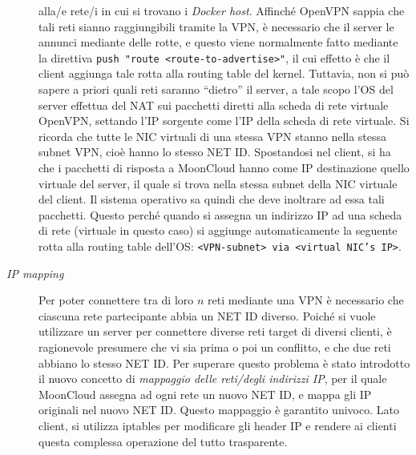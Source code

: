 \begin{description}
	alla/e rete/i in cui si trovano i \textit{Docker host}. Affinché OpenVPN sappia che
	tali reti sianno raggiungibili tramite la VPN, è necessario che il server
	le annunci mediante delle rotte, e questo viene normalmente fatto mediante la direttiva
	\texttt{push "route <route-to-advertise>"}, il cui effetto è che il client aggiunga
	tale rotta alla routing table del kernel. Tuttavia, non si può sapere a priori
	quali reti saranno ``dietro'' il server, a tale scopo l'OS del server
	effettua del NAT sui pacchetti diretti alla scheda di rete virtuale OpenVPN,
	settando l'IP sorgente come l'IP della scheda di rete virtuale. Si ricorda che
	tutte le NIC virtuali di una stessa VPN stanno nella stessa subnet VPN, cioè hanno
	lo stesso NET ID.
	Spostandosi
	nel client, si ha che i pacchetti di risposta a MoonCloud hanno come IP destinazione
	quello virtuale del server, il quale si trova nella stessa subnet della NIC
	virtuale del client. Il sistema operativo sa quindi che deve inoltrare ad essa
	tali pacchetti. 
	Questo perché quando si assegna un indirizzo IP ad una scheda di rete (virtuale in
	questo caso) si
	aggiunge automaticamente la seguente rotta alla routing table dell'OS:
	\texttt{<VPN-subnet> via <virtual NIC's IP>}.
	\item[\textit{IP mapping}]Per poter connettere tra di loro $n$ reti mediante
	una VPN è necessario che ciascuna rete partecipante abbia un NET ID diverso. Poiché
	si vuole utilizzare un server per connettere diverse reti target di diversi clienti,
	è ragionevole presumere che vi sia prima o poi un conflitto, e che due reti abbiano
	lo stesso NET ID. Per superare questo problema è stato introdotto il nuovo concetto
	di \textit{mappaggio delle reti/degli indirizzi IP}, per il quale MoonCloud assegna
	ad ogni rete un nuovo NET ID, e mappa gli IP originali nel nuovo NET ID. Questo
	mappaggio è garantito univoco. Lato client, si utilizza iptables per
	modificare gli header IP e rendere ai clienti questa complessa operazione del tutto
	trasparente.
\end{description}
